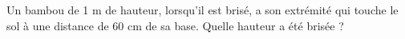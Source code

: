 \documentclass[exercice]{thedocument}%
\begin{document}
%
Un bambou de 1 m de hauteur, lorsqu'il est brisé, a son extrémité qui touche
le sol à une distance de 60 cm de sa base.
\vskip15pt Quelle hauteur a été brisée ?
\end{document}
